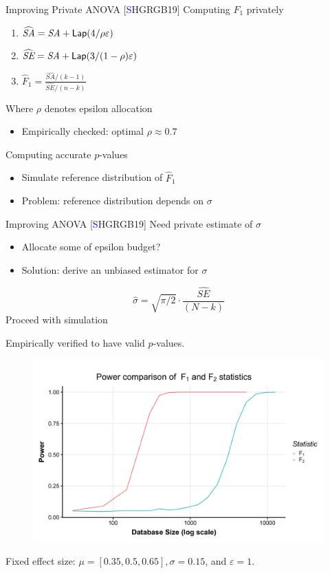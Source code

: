 \documentclass{beamer}
\newcommand{\se}{\textit{SE}\xspace}
\newcommand{\sa}{\textit{SA}\xspace}
\newcommand{\lap}{\ensuremath{{\sf Lap}}\xspace}
\begin{document}
\begin{frame}{Improving Private ANOVA [\textcolor{blue}{S}HGRGB19]}
Computing $F_1$ privately \pause
\begin{enumerate}
	\item $\widehat{\sa}  = \sa + \lap(4/\rho\varepsilon)$
    \item $\widehat{\se} = \sa + \lap(3/(1-\rho)\varepsilon)$ \pause
    \item $\widehat{F}_1 = \frac{\widehat{\sa}/(k-1)}{\widehat{\se}/(n-k)}$ \pause
\end{enumerate}
Where $\rho$ denotes epsilon allocation
\begin{itemize}
	\item Empirically checked: optimal $\rho \approx 0.7$ \pause
\end{itemize}
Computing accurate $p$-values \pause
\begin{itemize}
	\item Simulate reference distribution of $\widehat{F}_1$ \pause
	\item Problem: reference distribution depends on $\sigma$
\end{itemize}
\end{frame}


\begin{frame}{Improving ANOVA [\textcolor{blue}{S}HGRGB19]}
Need private estimate of $\sigma$ \pause
\begin{itemize}
	\item Allocate some of epsilon budget? \pause
	\item Solution: derive an unbiased estimator for $\sigma$ \pause
\end{itemize}
\bigskip

$$\hat{\sigma} = \sqrt{\pi/2} \cdot \frac{\widehat{SE}}{(N-k)} $$ \pause
\bigskip
Proceed with simulation
\bigskip

Empirically verified to have valid $p$-values.
\end{frame}


\begin{frame}{}
  \begin{figure}
  \includegraphics[scale=0.12]{images/f1-vs-f2}
  \end{figure}
  \centering
  Fixed effect size: $\mu = [0.35, 0.5, 0.65], \sigma = 0.15$, and $\varepsilon = 1$.

\end{frame}
\end{document}

